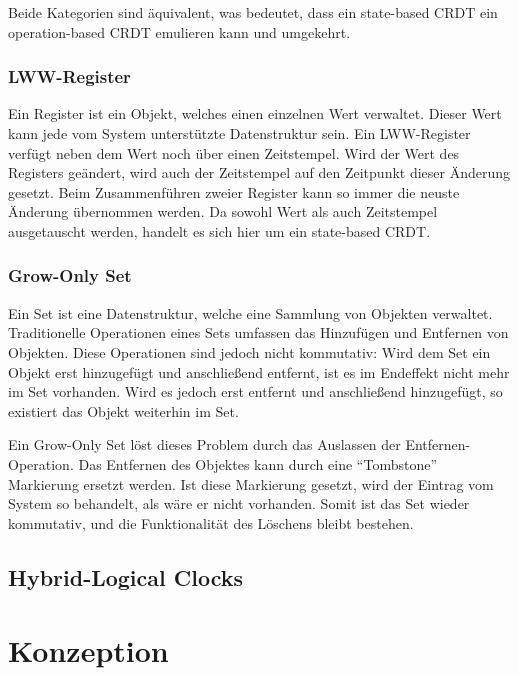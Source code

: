 \documentclass[a4paper, 12pt]{scrreprt}
\begin{document}
Beide Kategorien sind äquivalent\autocite[S. 9]{InproceedingsCRDTOriginal}, was bedeutet, dass ein state-based CRDT ein operation-based CRDT emulieren kann und umgekehrt.


\subsection{LWW-Register}
\sloppypar
Ein Register ist ein Objekt, welches einen einzelnen Wert verwaltet. Dieser Wert kann jede vom System unterstützte Datenstruktur sein. Ein \ac{LWW-Register} verfügt neben dem Wert noch über einen Zeitstempel. Wird der Wert des Registers geändert, wird auch der Zeitstempel auf den Zeitpunkt dieser Änderung gesetzt. Beim Zusammenführen zweier Register kann so immer die neuste Änderung übernommen werden. Da sowohl Wert als auch Zeitstempel ausgetauscht werden, handelt es sich hier um ein state-based CRDT.

\subsection{Grow-Only Set}
Ein Set ist eine Datenstruktur, welche eine Sammlung von Objekten verwaltet. Traditionelle Operationen eines Sets umfassen das Hinzufügen und Entfernen von Objekten. Diese Operationen sind jedoch nicht kommutativ: Wird dem Set ein Objekt erst hinzugefügt und anschließend entfernt, ist es im Endeffekt nicht mehr im Set vorhanden. Wird es jedoch erst entfernt und anschließend hinzugefügt, so existiert das Objekt weiterhin im Set.

Ein Grow-Only Set löst dieses Problem durch das Auslassen der Entfernen-Operation. Das Entfernen des Objektes kann durch eine \enquote{Tombstone} Markierung ersetzt werden. Ist diese Markierung gesetzt, wird der Eintrag vom System so behandelt, als wäre er nicht vorhanden. Somit ist das Set wieder kommutativ, und die Funktionalität des Löschens bleibt bestehen. 


\section{Hybrid-Logical Clocks}

\chapter{Konzeption}
\end{document}
